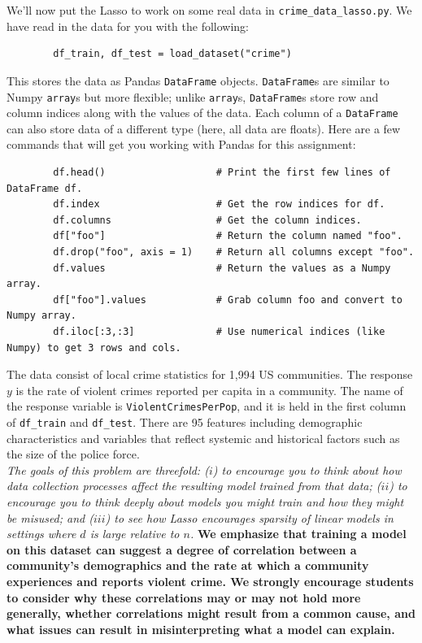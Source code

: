 \documentclass{article}
\begin{document}
\begin{aprob}
    \label{crime}
    We'll now put the Lasso to work on some real data in \texttt{crime\_data\_lasso.py}. We have read in the data for you with the following:

    \begin{verbatim}
        df_train, df_test = load_dataset("crime")
    \end{verbatim}

    This stores the data as Pandas \texttt{DataFrame} objects. \texttt{DataFrame}s are similar to Numpy \texttt{array}s but more flexible; unlike \texttt{array}s, \texttt{DataFrame}s store row and column indices along with the values of the data. Each column of a \texttt{DataFrame} can also store data of a different type (here, all data are floats).
    Here are a few commands that will get you working with Pandas for this assignment:

    \begin{verbatim}
        df.head()                   # Print the first few lines of DataFrame df.
        df.index                    # Get the row indices for df.
        df.columns                  # Get the column indices.
        df["foo"]                   # Return the column named "foo".
        df.drop("foo", axis = 1)    # Return all columns except "foo".
        df.values                   # Return the values as a Numpy array.
        df["foo"].values            # Grab column foo and convert to Numpy array.
        df.iloc[:3,:3]              # Use numerical indices (like Numpy) to get 3 rows and cols.
    \end{verbatim}

    The data consist of local crime statistics for 1,994 US communities. The response $y$ is the rate of violent crimes reported per capita in a community. The name of the response variable is \texttt{ViolentCrimesPerPop}, and it is held in the first column of \texttt{df\_train} and \texttt{df\_test}. There are 95 features including demographic characteristics and variables that reflect systemic and historical factors such as the size of the police force.\\

    \emph{The goals of this problem are threefold: ($i$) to encourage you to think about how data collection processes affect the resulting model trained from that data; ($ii$) to encourage you to think deeply about models you might train and how they might be misused; and ($iii$) to see how Lasso encourages sparsity of linear models in settings where $d$ is large relative to $n$.} {\bf We emphasize that training a model on this dataset can suggest a degree of correlation between a community's demographics and the rate at which a community experiences and reports violent crime. We strongly encourage students to consider why these correlations may or may not hold more generally, whether correlations might result from a common cause, and what issues can result in misinterpreting what a model can explain.}\\


\end{aprob}
\end{document}
